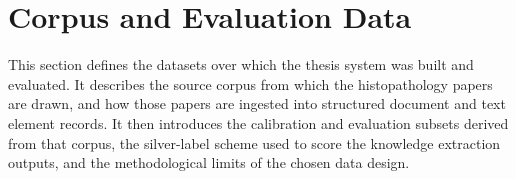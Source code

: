\section{Corpus and Evaluation Data}\label{section:Corpus}

\makeatletter
{}
\makeatother

This section defines the datasets over which the thesis system was built and evaluated. It describes the source corpus from which the histopathology papers are drawn, and how those papers are ingested into structured document and text element records. It then introduces the calibration and evaluation subsets derived from that corpus, the silver-label scheme used to score the knowledge extraction outputs, and the methodological limits of the chosen data design.










% 